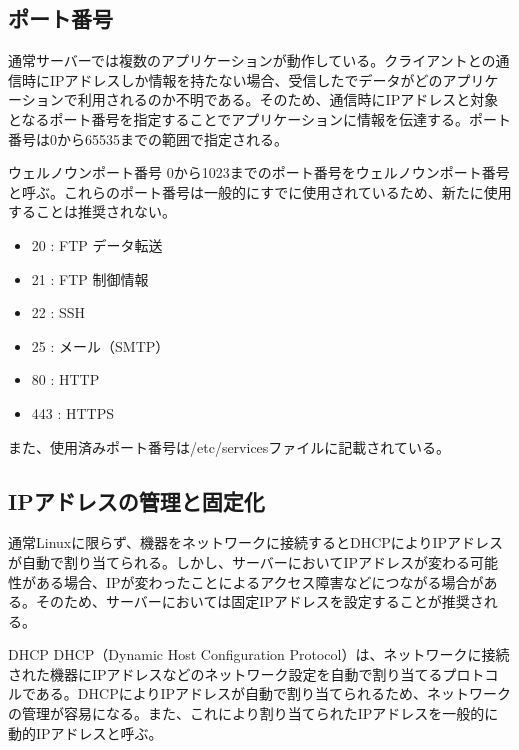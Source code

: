 \documentclass[a4paper, 11pt, dvipdfmx]{jsarticle}
\begin{document}
\subsection{ポート番号}
通常サーバーでは複数のアプリケーションが動作している。クライアントとの通信時にIPアドレスしか情報を持たない場合、受信したでデータがどのアプリケーションで利用されるのか不明である。そのため、通信時にIPアドレスと対象となるポート番号を指定することでアプリケーションに情報を伝達する。ポート番号は0から65535までの範囲で指定される。
\begin{hosokubox}{ウェルノウンポート番号}
  0から1023までのポート番号をウェルノウンポート番号と呼ぶ。これらのポート番号は一般的にすでに使用されているため、新たに使用することは推奨されない。
  \begin{itemize}
    \item 20 : FTP データ転送
    \item 21 : FTP 制御情報
    \item 22 : SSH
    \item 25 : メール（SMTP）
    \item 80 : HTTP
    \item 443 : HTTPS
  \end{itemize}
  また、使用済みポート番号は/etc/servicesファイルに記載されている。
\end{hosokubox}

\subsection{IPアドレスの管理と固定化}
通常Linuxに限らず、機器をネットワークに接続するとDHCPによりIPアドレスが自動で割り当てられる。しかし、サーバーにおいてIPアドレスが変わる可能性がある場合、IPが変わったことによるアクセス障害などにつながる場合がある。そのため、サーバーにおいては固定IPアドレスを設定することが推奨される。
\begin{hosokubox}{DHCP}
  DHCP（Dynamic Host Configuration Protocol）は、ネットワークに接続された機器にIPアドレスなどのネットワーク設定を自動で割り当てるプロトコルである。DHCPによりIPアドレスが自動で割り当てられるため、ネットワークの管理が容易になる。また、これにより割り当てられたIPアドレスを一般的に動的IPアドレスと呼ぶ。
\end{hosokubox}
\end{document}
